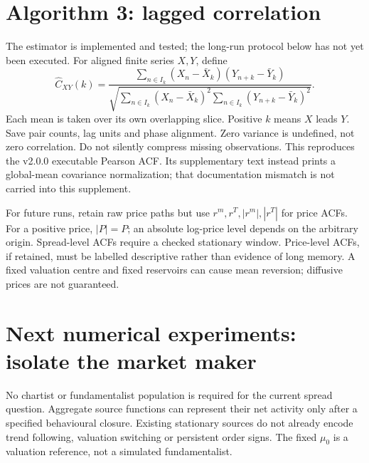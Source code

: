 \documentclass[11pt,a4paper]{article}
\begin{document}
\section{Algorithm 3: lagged correlation}
The estimator is implemented and tested; the long-run protocol below has
not yet been executed. For aligned finite series $X,Y$, define
\[
 \widehat C_{XY}(k)=
 \frac{\sum_{n\in I_k}(X_n-\bar X_k)(Y_{n+k}-\bar Y_k)}
 {\sqrt{\sum_{n\in I_k}(X_n-\bar X_k)^2
              \sum_{n\in I_k}(Y_{n+k}-\bar Y_k)^2}}.
\]
Each mean is taken over its own overlapping slice. Positive $k$ means $X$
leads $Y$. Save pair counts, lag units and phase alignment. Zero variance is
undefined, not zero correlation. Do not silently compress missing observations.
This reproduces the v2.0.0 executable Pearson ACF. Its supplementary text
instead prints a global-mean covariance normalization; that documentation
mismatch is not carried into this supplement.

For future runs, retain raw price paths but use $r^m,r^T,|r^m|,|r^T|$ for
price ACFs. For a positive price, $|P|=P$; an absolute log-price level depends
on the arbitrary origin. Spread-level ACFs require a checked stationary
window. Price-level ACFs, if retained, must be labelled descriptive rather
than evidence of long memory. A fixed valuation centre and fixed reservoirs
can cause mean reversion; diffusive prices are not guaranteed.

\newpage
\section{Next numerical experiments: isolate the market maker}
No chartist or fundamentalist population is required for the current spread
question. Aggregate source functions can represent their net activity only
after a specified behavioural closure. Existing stationary sources do not
already encode trend following, valuation switching or persistent order signs.
The fixed $\mu_0$ is a valuation reference, not a simulated fundamentalist.
\end{document}

